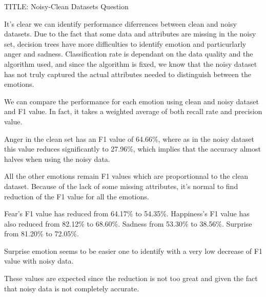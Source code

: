 TITLE: Noisy-Clean Datasets Question


It's clear we can identify performance diferrences between clean and noisy datasets.
Due to the fact that some data and attributes are missing in the noisy set, decision trees have more
difficulties to identify emotion and particurlarly anger and sadness.
Classification rate is dependant on the data quality and the algorithm used, 
and since the algorithm is fixed, we know that the noisy dataset has not truly
captured the actual attributes needed to distinguish between the emotions.


We can compare the performance for each emotion using clean and noisy dataset and
F1 value. In fact, it takes a weighted average of both recall rate and precision value. 


Anger in the clean set has an F1 value of 64.66\%, where as in the noisy dataset this 
value reduces significantly to 27.96\%, which implies that the accuracy almost halves 
when using the noisy data. 

All the other emotions remain F1 values which are proportionnal to the clean dataset. 
Because of the lack of some missing attributes, it's normal to find reduction of the
F1 value for all the emotions.

Fear's F1 value has reduced from 64.17\% to 54.35\%. 
Happiness's F1 value has also reduced from 82.12\% to 68.60\%.
Sadness from 53.30\% to 38.56\%. 
Surprise from 81.20\% to 72.05\%.

Surprise emotion seems to be easier one to identify with a very low decrease of F1 value
with noisy data.  

These values are expected since the reduction is not too great and given the 
fact that noisy data is not completely accurate.